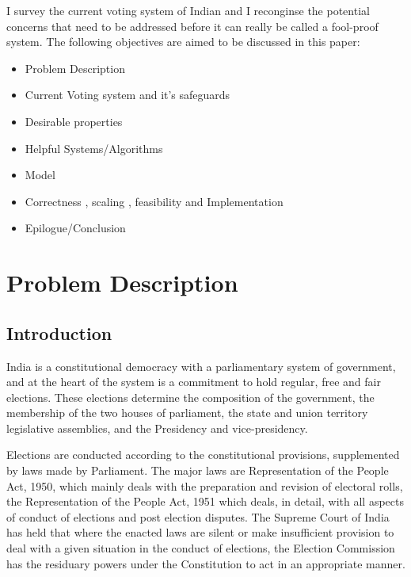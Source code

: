 \documentclass[12pt]{report}
\begin{document}
\vspace{0.5cm}
I survey the current voting system of Indian and I reconginse the potential concerns that need to be addressed before it can really be called a fool-proof system.
\vspace{0.2cm}
The following objectives are aimed to be discussed in this paper:
\begin{itemize}
  \item
  Problem Description
  \item
  Current Voting system and it's safeguards 
  \item
  Desirable properties 
  \item
  Helpful Systems/Algorithms 
  \item
  Model  
  \item
  Correctness , scaling , feasibility and Implementation
  \item 
  Epilogue/Conclusion
\end{itemize}

\chapter{Problem Description}
\section{Introduction}

India is a constitutional democracy with a parliamentary system of government, and at the heart of the system is a commitment to hold regular, free and fair elections. These elections determine the composition of the government, the membership of the two houses of parliament, the state and union territory legislative assemblies, and the Presidency and vice-presidency.

Elections are conducted according to the constitutional provisions, supplemented by laws made by Parliament. The major laws are Representation of the People Act, 1950, which mainly deals with the preparation and revision of electoral rolls, the Representation of the People Act, 1951 which deals, in detail, with all aspects of conduct of elections and post election disputes. The Supreme Court of India has held that where the enacted laws are silent or make insufficient provision to deal with a given situation in the conduct of elections, the Election Commission has the residuary powers under the Constitution to act in an appropriate manner. 
\end{document}
